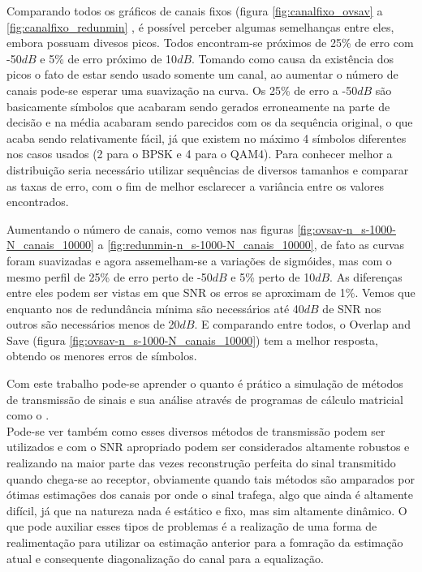 \documentclass[a4paper,twoside]{articlewithlogo}
\begin{document}


Comparando todos os gráficos de canais fixos (figura \ref{fig:canalfixo_ovsav} a \ref{fig:canalfixo_redunmin}
, é possível perceber algumas semelhanças entre eles, embora possuam divesos picos. Todos encontram-se próximos de 25\% de erro com -50$dB$ e 5\% de erro próximo de 10$dB$. 
Tomando como causa da existência dos picos o fato de estar sendo usado somente um canal, ao aumentar o número de canais pode-se esperar uma suavização na curva.
Os 25\% de erro a -50$dB$ são basicamente símbolos que acabaram sendo gerados erroneamente na parte de decisão e na média acabaram sendo parecidos com os da sequência original, o que acaba sendo relativamente fácil, já que existem no máximo 4 símbolos diferentes nos casos usados (2 para o BPSK e 4 para o QAM4).
Para conhecer melhor a distribuição seria necessário utilizar sequências de diversos tamanhos e comparar as taxas de erro, com o fim de melhor esclarecer a variância entre os valores encontrados.

Aumentando o número de canais, como vemos nas figuras \ref{fig:ovsav-n_s-1000-N_canais_10000} a \ref{fig:redunmin-n_s-1000-N_canais_10000}, de fato as curvas foram suavizadas e agora assemelham-se a variações de sigmóides, mas com o mesmo perfil de 25\% de erro perto de -50$dB$ e 5\% perto de 10$dB$.
As diferenças entre eles podem ser vistas em que SNR os erros se aproximam de 1\%. Vemos que enquanto nos de redundância mínima são necessários até 40$dB$ de SNR nos outros são necessários menos de 20$dB$.
E comparando entre todos, o Overlap and Save (figura \ref{fig:ovsav-n_s-1000-N_canais_10000}) tem a melhor resposta, obtendo os menores erros de símbolos.



Com este trabalho pode-se aprender o quanto é prático a simulação de métodos de transmissão de sinais e sua análise através de programas de cálculo matricial como o \Matlab.\\ Pode-se ver também como esses diversos métodos de transmissão podem ser utilizados e com o SNR apropriado podem ser considerados altamente robustos e realizando na maior parte das vezes reconstrução perfeita do sinal transmitido quando chega-se ao receptor, obviamente quando tais métodos são amparados por ótimas estimações dos canais por onde o sinal trafega, algo que ainda é altamente difícil, já que na natureza nada é estático e fixo, mas sim altamente dinâmico. O que pode auxiliar esses tipos de problemas é a realização de uma forma de realimentação para utilizar oa estimação anterior para a fomração da estimação atual e consequente diagonalização do canal para a equalização.



\end{document}
